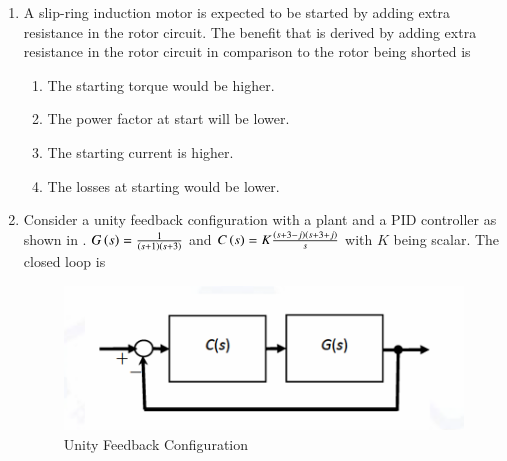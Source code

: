 \documentclass[journal,12pt,onecolumn]{IEEEtran}
\theoremstyle{remark}
\begin{document}
\begin{enumerate}
\item A slip-ring induction motor is expected to be started by adding extra
resistance in the rotor circuit. The benefit that is derived by adding extra
resistance in the rotor circuit in comparison to the rotor being shorted is \par \hfill{}
\begin{enumerate}[label=(\Alph*)]
\item The starting torque would be higher.
\item The power factor at start will be lower.
\item The starting current is higher.
\item The losses at starting would be lower.
\end{enumerate}

\item Consider a unity feedback configuration with a plant and a PID controller as shown in . $G\left(s\right) = \frac{1}{\left(s+1\right)\left(s+3\right)}$
and $C\left(s\right) = K\frac{\left(s+3-j\right)\left(s+3+j\right)}{s}$
with $K$ being scalar. The closed loop is \par \hfill{}
\begin{figure}[H]
    \centering
    \includegraphics[width=0.5\linewidth]{Figs/Q-29.png}
    \caption{Unity Feedback Configuration}
    \label{29}
\end{figure}
\begin{enumerate}[label=(\Alph*)]
\end{enumerate}


\end{enumerate}
\end{document}

